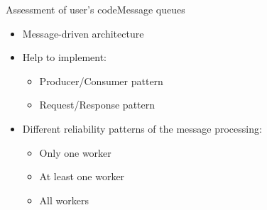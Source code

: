 \documentclass{beamer}
\begin{document}
\begin{frame}{Assessment of user's code}{Message queues}
  \begin{itemize}
    \item {
      Message-driven architecture
    }
    \item {
      Help to implement:
      \begin{itemize}
        \item Producer/Consumer pattern
        \item \alert<2> {Request/Response pattern}
      \end{itemize}
    }
    \item {
      Different reliability patterns of the message processing:
      \begin{itemize}
        \item \alert<2> {Only one worker}
        \item At least one worker
        \item All workers
      \end{itemize}
    }
  \end{itemize}
\end{frame}
\end{document}

